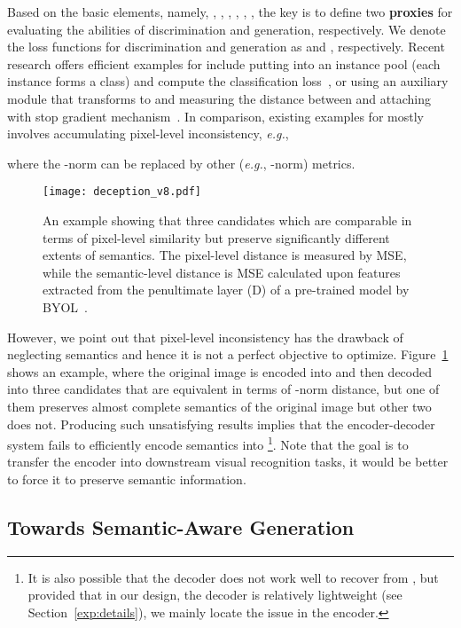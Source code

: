 \documentclass[10pt,twocolumn,letterpaper]{article}
\begin{document}
Based on the basic elements, namely, , , , , , , the key is to define two \textbf{proxies} for evaluating the abilities of discrimination and generation, respectively. We denote the loss functions for discrimination and generation as  and , respectively. Recent research offers efficient examples for  include putting  into an instance pool  (each instance forms a class) and compute the classification loss~\cite{chen2020simple,he2020momentum}, or using an auxiliary module  that transforms  to  and measuring the distance between  and  attaching with stop gradient mechanism~\cite{grill2020bootstrap, chen2020improved}. In comparison, existing examples for  mostly involves accumulating pixel-level inconsistency, \textit{e.g.},

where the -norm can be replaced by other (\textit{e.g.}, -norm) metrics.

\begin{figure}[!t]
\centering
\texttt{[image: deception\_v8.pdf]}
\caption{An example showing that three candidates which are comparable in terms of pixel-level similarity but preserve significantly different extents of semantics. The pixel-level distance is measured by MSE, while the semantic-level distance is MSE calculated upon features extracted from the penultimate layer (D) of a pre-trained model by BYOL~\cite{grill2020bootstrap}.}
\label{fig:pixel-level}
\end{figure}

However, we point out that pixel-level inconsistency has the drawback of neglecting semantics and hence it is not a perfect objective to optimize. Figure~\ref{fig:pixel-level} shows an example, where the original image  is encoded into  and then decoded into three candidates that are equivalent in terms of -norm distance, but one of them preserves almost complete semantics of the original image but other two does not. Producing such unsatisfying results implies that the encoder-decoder system fails to efficiently encode semantics into \footnote{It is also possible that the decoder does not work well to recover  from , but provided that in our design, the decoder is relatively lightweight (see Section~\ref{exp:details}), we mainly locate the issue in the encoder.}. Note that the goal is to transfer the encoder into downstream visual recognition tasks, it would be better to force it to preserve semantic information.

\subsection{Towards Semantic-Aware Generation}
\label{approach:generation}
\end{document}

